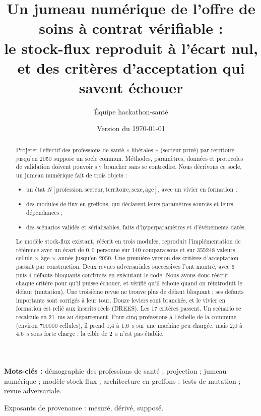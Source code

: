 \documentclass[11pt]{article}
\title{Un jumeau numérique de l'offre de soins à contrat vérifiable :\\
le stock-flux reproduit à l'écart nul, et des critères d'acceptation qui savent échouer}
\author[1]{Équipe hackathon-santé}
\affil[1]{Projet « jumeau numérique de l'offre de soins », dépôt \texttt{hackathon-sante/v2}}
\date{Version du \today}
\begin{document}
\maketitle

\begin{abstract}
Projeter l'effectif des professions de santé « libérales » (secteur privé) par territoire jusqu'en 2050
suppose un socle commun. Méthodes, paramètres, données et protocoles de validation doivent pouvoir s'y
brancher sans se contredire. Nous décrivons ce socle, un jumeau numérique fait de trois objets :
\begin{itemize}
  \item un état $N[\text{profession},\text{secteur},\text{territoire},\text{sexe},\text{âge}]$, avec un
        vivier en formation ;
  \item des modules de flux en greffons, qui déclarent leurs paramètres sourcés et leurs dépendances ;
  \item des scénarios validés et sérialisables, faits d'hyperparamètres et d'événements datés.
\end{itemize}
Le modèle stock-flux existant, réécrit en trois modules, reproduit l'implémentation de référence avec
un écart de $0{,}0$\mesure{} personne sur 140\mesure{} comparaisons et sur
\num{355248}\mesure{} valeurs cellule $\times$ âge $\times$ année jusqu'en 2050. Une première version
des critères d'acceptation passait par construction. Deux revues adversariales successives l'ont
montré, avec 6\mesure{} puis 4\mesure{} défauts bloquants confirmés en exécutant le code. Nous avons
donc réécrit chaque critère pour qu'il puisse échouer, et vérifié qu'il échoue quand on réintroduit
le défaut (mutation). Une troisième revue ne trouve plus de défaut bloquant ; ses défauts importants
sont corrigés à leur tour. Douze leviers sont branchés, et le vivier en formation est relié aux
inscrits réels (DREES). Les 17\mesure{} critères passent. Un scénario se recalcule en 21\mesure{}~ms au
département. Pour cinq professions à l'échelle de la commune (environ \num{700000} cellules), il
prend 1,4 à 1,6\mesure{}~s sur une machine peu chargée, mais 2,0 à 4,6\mesure{}~s sous forte charge :
la cible de 2\suppose{}~s n'est pas établie.
\end{abstract}
\noindent\textbf{Mots-clés :} démographie des professions de santé ; projection ; jumeau numérique ;
modèle stock-flux ; architecture en greffons ; tests de mutation ; revue adversariale.

\noindent\small Exposants de provenance : \mesure{} mesuré, \derive{} dérivé, \suppose{} supposé.\normalsize
\end{document}
